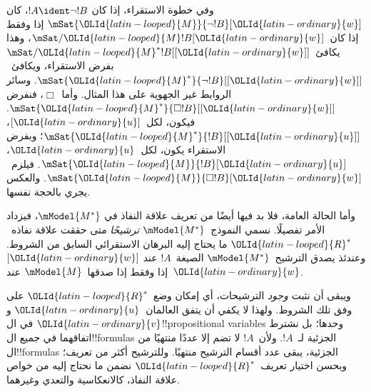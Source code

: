 \documentclass[../../../include/open-logic-section]{subfiles}
\begin{document}
وفي خطوة الاستقراء، إذا كان $!A \ident \lnot !B$،
كان $\mSat{\OLId{latin-looped}{M}}{\lnot !B}[\OLId{latin-ordinary}{w}]$ إذا وفقط إذا كان~$\mSat/{\OLId{latin-looped}{M}}{!B}[\OLId{latin-ordinary}{w}]$،
وهذا يكافئ~$\mSat/{\OLId{latin-looped}{M}^*}{!B}[{[\OLId{latin-ordinary}{w}]}]$ بفرض الاستقراء،
ويكافئ~$\mSat{\OLId{latin-looped}{M}^*}{\lnot !B}[{[\OLId{latin-ordinary}{w}]}]$. وسائر
الروابط غير الجهوية على هذا المثال.
وأما~$\Box$، فنفرض
$\mSat{\OLId{latin-looped}{M}^*}{\Box !B}[{[\OLId{latin-ordinary}{w}]}]$. فيكون، لكل~$[\OLId{latin-ordinary}{u}]$،
$\mSat{\OLId{latin-looped}{M}^*}{!B}[{[\OLId{latin-ordinary}{u}]}]$؛ وبفرض الاستقراء يكون، لكل~$\OLId{latin-ordinary}{u}$،
$\mSat{\OLId{latin-looped}{M}}{!B}[\OLId{latin-ordinary}{u}]$. فيلزم~$\mSat{\OLId{latin-looped}{M}}{\Box !B}[\OLId{latin-ordinary}{w}]$.
والعكس يجري بالحجة نفسها.

وأما الحالة العامة، فلا بد فيها أيضًا من تعريف
علاقة النفاذ في $\mModel{M^*}$، فيزداد الأمر تفصيلًا.
نسمي النموذج~$\mModel{M^*}$ \emph{ترشيحًا} متى حققت
علاقة نفاذه~$\OLId{latin-looped}{R}^*$ ما يحتاج إليه البرهان الاستقرائي
السابق من الشروط. وعندئذ يصدق الترشيح~$\mModel{M^*}$
الصيغة~$!A$ عند $[\OLId{latin-ordinary}{w}]$ إذا وفقط إذا صدقها~$\mModel{M}$
عند~$\OLId{latin-ordinary}{w}$.

ويبقى أن نثبت \emph{وجود} الترشيحات، أي إمكان وضع~$\OLId{latin-looped}{R}^*$
على وفق تلك الشروط. ولهذا لا يكفي أن يتفق العالمان~$\OLId{latin-ordinary}{u}$
و$\OLId{latin-ordinary}{v}$ في ال!!{propositional variable}s وحدها؛ بل
نشترط اتفاقهما في جميع ال!!{formula}s الجزئية لـ~$!A$.
ولأن~$!A$ لا تضم إلا عددًا منتهيًا من ال!!{formula}s
الجزئية، يبقى عدد أقسام الترشيح منتهيًا.
وللترشيح أكثر من تعريف؛ وبحسن اختيار تعريف~$\OLId{latin-looped}{R}^*$
نضمن ما نحتاج إليه من خواص علاقة النفاذ،
كالانعكاسية والتعدي وغيرهما.
\end{document}
